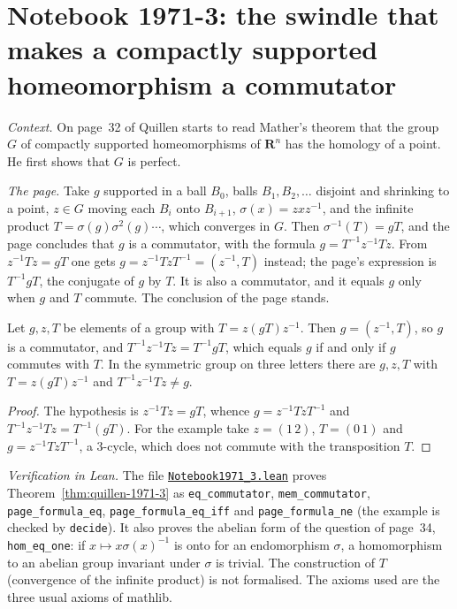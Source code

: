 \section[Notebook 1971-3: the swindle that makes $g$ a commutator]{Notebook 1971-3: the swindle that makes a compactly supported homeomorphism a commutator\protect{}}\label{sec:quillen-1971-3}

\emph{Context.} On page~32 of  Quillen starts to read Mather's theorem that the group $G$ of compactly supported homeomorphisms of $\mathbf R^n$ has the homology of a point. He first shows that $G$ is perfect.

\emph{The page.} Take $g$ supported in a ball $B_0$, balls $B_1, B_2, \ldots$ disjoint and shrinking to a point, $z \in G$ moving each $B_i$ onto $B_{i+1}$, $\sigma(x) = zxz^{-1}$, and the infinite product $T = \sigma(g)\sigma^2(g)\cdots$, which converges in $G$. Then $\sigma^{-1}(T) = gT$, and the page concludes that $g$ is a commutator, with the formula $g = T^{-1}z^{-1}Tz$. From $z^{-1}Tz = gT$ one gets $g = z^{-1}TzT^{-1} = (z^{-1}, T)$ instead; the page's expression is $T^{-1}gT$, the conjugate of $g$ by $T$. It is also a commutator, and it equals $g$ only when $g$ and $T$ commute. The conclusion of the page stands.

\begin{encadre}
\begin{theoreme}\label{thm:quillen-1971-3}
Let $g, z, T$ be elements of a group with $T = z(gT)z^{-1}$. Then $g = (z^{-1}, T)$, so $g$ is a commutator, and $T^{-1}z^{-1}Tz = T^{-1}gT$, which equals $g$ if and only if $g$ commutes with $T$. In the symmetric group on three letters there are $g, z, T$ with $T = z(gT)z^{-1}$ and $T^{-1}z^{-1}Tz \ne g$.
\end{theoreme}
\end{encadre}

\begin{proof}
The hypothesis is $z^{-1}Tz = gT$, whence $g = z^{-1}TzT^{-1}$ and $T^{-1}z^{-1}Tz = T^{-1}(gT)$. For the example take $z = (1\,2)$, $T = (0\,1)$ and $g = z^{-1}TzT^{-1}$, a $3$-cycle, which does not commute with the transposition $T$.
\end{proof}

\emph{Verification in Lean.} The file \href{\leanblobmain/Notebook1971_3.lean}{\texttt{Notebook1971\_3.\allowbreak{}lean}} proves Theorem~\ref{thm:quillen-1971-3} as \texttt{eq\_commutator}, \texttt{mem\_commutator}, \texttt{page\_formula\_eq}, \texttt{page\_formula\_eq\_iff} and \texttt{page\_formula\_ne} (the example is checked by \texttt{decide}). It also proves the abelian form of the question of page~34, \texttt{hom\_eq\_one}: if $x \mapsto x\sigma(x)^{-1}$ is onto for an endomorphism $\sigma$, a homomorphism to an abelian group invariant under $\sigma$ is trivial. The construction of $T$ (convergence of the infinite product) is not formalised. The axioms used are the three usual axioms of mathlib.

